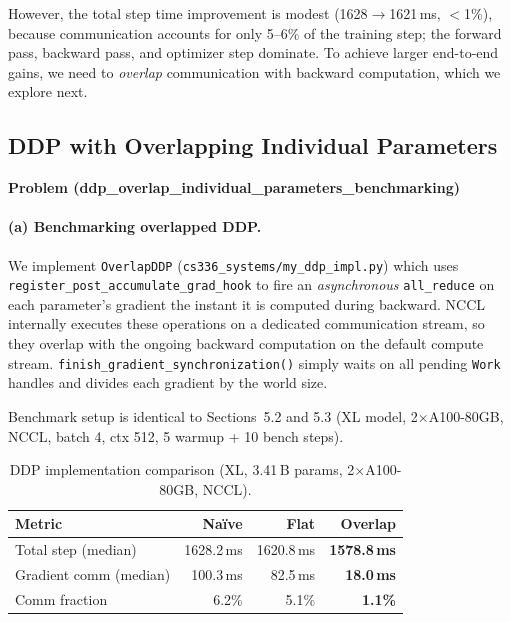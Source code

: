 \documentclass[11pt]{article}
\begin{document}
However, the total step time improvement is modest (1628$\to$1621\,ms,
$<$1\%), because communication accounts for only 5--6\% of the training
step; the forward pass, backward pass, and optimizer step dominate.
To achieve larger end-to-end gains, we need to \emph{overlap}
communication with backward computation, which we explore next.

\subsection{DDP with Overlapping Individual Parameters}
\textbf{Problem (ddp\_overlap\_individual\_parameters\_benchmarking)}

\paragraph{(a) Benchmarking overlapped DDP.}

We implement \texttt{OverlapDDP} (\texttt{cs336\_systems/my\_ddp\_impl.py})
which uses \texttt{register\_post\_accumulate\_grad\_hook} to fire an
\emph{asynchronous} \texttt{all\_reduce} on each parameter's gradient the
instant it is computed during backward.  NCCL internally executes these
operations on a dedicated communication stream, so they overlap with the
ongoing backward computation on the default compute stream.
\texttt{finish\_gradient\_synchronization()} simply waits on all pending
\texttt{Work} handles and divides each gradient by the world size.

Benchmark setup is identical to Sections~5.2 and 5.3
(XL model, 2$\times$A100-80GB, NCCL, batch 4, ctx 512, 5 warmup + 10 bench steps).

\begin{table}[H]
\centering
\caption{DDP implementation comparison (XL, 3.41\,B params, 2$\times$A100-80GB, NCCL).}
\label{tab:overlap-ddp}
\begin{tabular}{l rrr}
  \toprule
  Metric & Na\"ive & Flat & Overlap \\
  \midrule
  Total step (median)    & 1628.2\,ms & 1620.8\,ms & \textbf{1578.8\,ms} \\
  Gradient comm (median) &  100.3\,ms &   82.5\,ms &  \textbf{18.0\,ms} \\
  Comm fraction          &    6.2\%   &    5.1\%   &  \textbf{1.1\%} \\
  \bottomrule
\end{tabular}
\end{table}
\end{document}
